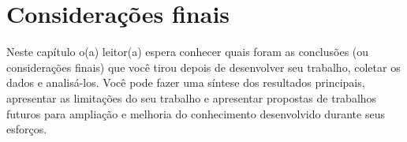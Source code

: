 \chapter{Considerações finais}
\label{conclusoes}

Neste capítulo o(a) leitor(a) espera conhecer quais foram as conclusões (ou considerações finais) que você tirou depois de desenvolver seu trabalho, coletar os dados e analisá-los. Você pode fazer uma síntese dos resultados principais, apresentar as limitações do seu trabalho e apresentar propostas de trabalhos futuros para ampliação e melhoria do conhecimento desenvolvido durante seus esforços.